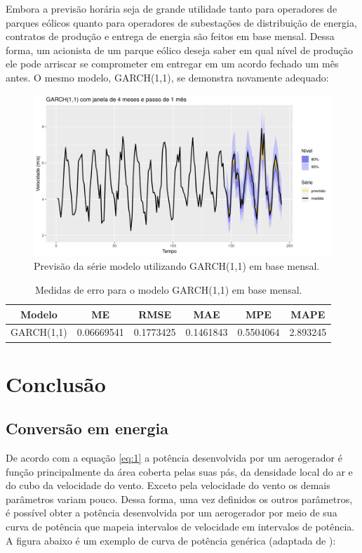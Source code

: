 \documentclass[
	12pt,				%
	openright,			%
	oneside,			%
	a4paper,			%
	english,			%
	french,				%
	spanish,			%
	brazil				%
	]{abntex2}
\begin{document}
Embora a previsão horária seja de grande utilidade tanto para operadores de parques eólicos quanto para operadores de subestações de distribuição de energia, contratos de produção e entrega de energia são feitos em base mensal. Dessa forma, um acionista de um parque eólico deseja saber em qual nível de produção ele pode arriscar se comprometer em entregar em um acordo fechado um mês antes. O mesmo modelo, GARCH(1,1), se demonstra novamente adequado:

\begin{figure}[h]
    \centering
	\includegraphics[width=\textwidth]{garch_month_edited}
	\caption{Previsão da série modelo utilizando GARCH(1,1) em base mensal.}
\end{figure}
\FloatBarrier

\begin{table}[h]
\centering
\begin{tabular}{ |c|c|c|c|c|c| } 
\hline
\textbf{Modelo}&\textbf{ME}&\textbf{RMSE}&\textbf{MAE}&\textbf{MPE}&\textbf{MAPE}\\
\hline
GARCH(1,1)&0.06669541&0.1773425&0.1461843&0.5504064&2.893245\\
\hline
\end{tabular}
\caption{Medidas de erro para o modelo GARCH(1,1) em base mensal.}
\end{table}

\part{Conclusão}

\chapter{Conversão em energia}

De acordo com a equação \ref{eq:1} a potência desenvolvida por um aerogerador é função principalmente da área coberta pelas suas pás, da densidade local do ar e do cubo da velocidade do vento. Exceto pela velocidade do vento os demais parâmetros variam pouco. Dessa forma, uma vez definidos os outros parâmetros, é possível obter a potência desenvolvida por um aerogerador por meio de sua curva de potência que mapeia intervalos de velocidade em intervalos de potência. A figura abaixo é um exemplo de curva de potência genérica (adaptada de \cite{pccurve}):
\end{document}
